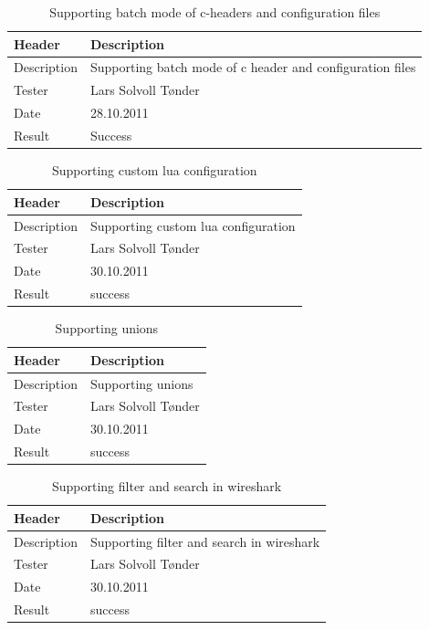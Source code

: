 \begin{table}[!htb] \footnotesize \center
\caption{Supporting \gls{batch mode} of \Gls{c}-\glspl{header} and configuration files\label{tab:sp3TID15}}
\begin{tabular}{l l}
	\toprule
	Header & Description \\
	\midrule
	Description & Supporting \gls{batch mode} of \Gls{c} \gls{header} and configuration files \\
	Tester & Lars Solvoll Tønder \\
	Date & 28.10.2011 \\
	Result & Success\\
	\bottomrule
\end{tabular}
\end{table}

\begin{table}[!htb] \footnotesize \center
\caption{Supporting custom \Gls{lua} configuration\label{tab:sp3TID16}}
\begin{tabular}{l l}
	\toprule
	Header & Description \\
	\midrule
	Description & Supporting custom \Gls{lua} configuration\\
	Tester & Lars Solvoll Tønder \\
	Date & 30.10.2011\\
	Result & success\\
	\bottomrule
\end{tabular}
\end{table}

\begin{table}[!htb] \footnotesize \center
\caption{Supporting \glspl{union}\label{tab:sp3TID17}}
\begin{tabular}{l l}
	\toprule
	Header & Description \\
	\midrule
	Description & Supporting \glspl{union}\\
	Tester & Lars Solvoll Tønder\\
	Date & 30.10.2011\\
	Result & success\\
	\bottomrule
\end{tabular}
\end{table}

\begin{table}[!htb] \footnotesize \center
\caption{Supporting filter and search in \Gls{wireshark}\label{tab:sp3TID18}}
\begin{tabular}{l l}
	\toprule
	Header & Description \\
	\midrule
	Description & Supporting filter and search in \Gls{wireshark}\\
	Tester & Lars Solvoll Tønder \\
	Date & 30.10.2011\\
	Result & success\\
	\bottomrule
\end{tabular}
\end{table}

